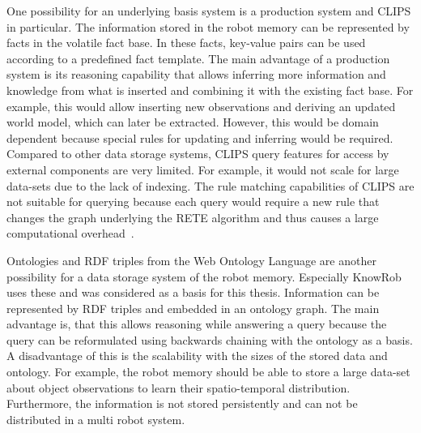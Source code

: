 One possibility for an underlying basis system is a production system
and CLIPS in particular. The information stored in the robot memory
can be represented by facts in the volatile fact base. In these facts,
key-value pairs can be used according to a predefined fact
template. The main advantage of a production system is its reasoning
capability that allows inferring more information and knowledge from
what is inserted and combining it with the existing fact base. For
example, this would allow inserting new observations and deriving an
updated world model, which can later be extracted. However,
this would be domain dependent because special rules for updating and inferring
would be required. Compared to other data storage systems,
CLIPS query features for access by external components are very
limited. For example, it would not scale for large data-sets due to the
lack of indexing. The rule matching capabilities of CLIPS are not
suitable for querying because each query would require a new rule that
changes the graph underlying the RETE algorithm and thus causes a
large computational overhead~\cite{Rete}.

Ontologies and RDF triples from the Web Ontology Language are another
possibility for a data storage system of the robot memory. Especially
KnowRob uses these and was considered as a basis for this
thesis. Information can be represented by RDF triples and embedded in
an ontology graph. The main advantage is, that this allows reasoning
while answering a query because the query can be reformulated using
backwards chaining with the ontology as a basis. A disadvantage of this is
the scalability with the sizes of the stored data and ontology. For
example, the robot memory should be able to store a large data-set
about object observations to learn their spatio-temporal
distribution. Furthermore, the information is not stored persistently
and can not be distributed in a multi robot system.

